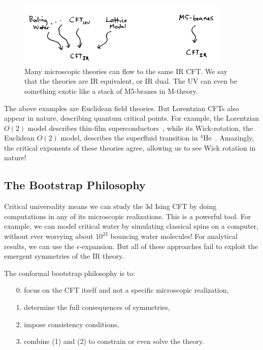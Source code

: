 \documentclass[11pt]{ws-rv9x6}
\newcommand\e\epsilon
\newcommand\<\langle
\renewcommand\>\rangle
\renewcommand\.{\cdot}
\begin{document}
\begin{figure}
\begin{center}
\includegraphics[width=0.9\textwidth]{rgflows.jpg}
\end{center}
\caption{Many  microscopic theories can flow to the same IR CFT\@. We say that the theories are IR equivalent, or IR dual. The UV can even be something exotic like a stack of M5-branes in M-theory. \label{fig:rgflows}}
\end{figure}

The above examples are Euclidean field theories. But Lorentzian CFTs also appear in nature, describing quantum critical points. For example, the Lorentzian $O(2)$ model describes thin-film superconductors~\cite{PhysRevB.44.6883,PhysRevLett.95.180603}, while its Wick-rotation, the Euclidean $O(2)$ model, describes the superfluid transition in ${}^4$He~\cite{Lipa:2003zz}. Amazingly, the critical exponents of these theories agree, allowing us to see Wick rotation in nature!

\subsection{The Bootstrap Philosophy}

Critical universality means we can study the 3d Ising CFT by doing computations in any of its microscopic realizations. This is a powerful tool.  For example, we can model critical water by simulating classical spins on a computer, without ever worrying about $10^{23}$ bouncing water molecules!  For analytical results, we can use the $\e$-expansion.  But all of these approaches fail to exploit the emergent symmetries of the IR theory.

The conformal bootstrap philosophy is to:
\begin{enumerate}
\item[0.] focus on the CFT itself and not a specific microscopic realization,
\item[1.] determine the full consequences of symmetries,
\item[2.] impose consistency conditions,
\item[3.] combine (1) and (2) to constrain or even solve the theory.
\end{enumerate}
\end{document}
